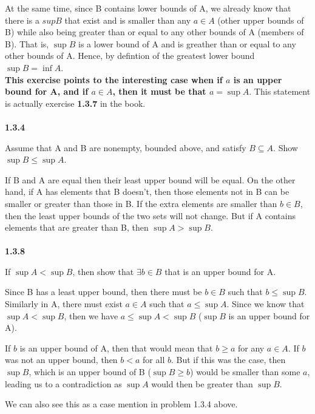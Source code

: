 At the same time, since B contains lower bounds of A, we already know that there is a $sup B$ that exist and is smaller
than any $a \in A$ (other upper bounds of B) while also being greater than or equal to any other bounds of A (members of B).
That is, $\sup B$ is a lower bound of A and is greather than or equal to any other bounds of A.
Hence, by defintion of the greatest lower bound $\sup B = \inf A$.
\\

\textbf{This exercise points to the interesting case when if $a$ is an upper bound for A,
and if $a \in A$, then it must be that $a = \sup A$}.
This statement is actually exercise \textbf{1.3.7} in the book.
\\~\\


\textbf{1.3.4}

Assume that A and B are nonempty, bounded above, and satisfy $B \subseteq A$. Show $\sup B \leq \sup A$.

If B and A are equal then their least upper bound will be equal.
On the other hand, if A has elements that B doesn't, then those elements not in B can be smaller or greater than those in B.
If the extra elements are smaller than $b \in B$, then the least upper bounds of the two sets will not change.
But if A contains elements that are greater than B, then $\sup A > \sup B$.
\\~\\


\textbf{1.3.8}

If $\sup A < \sup B$, then show that $\exists b \in B$ that is an upper bound for A.

Since B has a least upper bound, then there must be $b \in B$ such that $b \leq \sup B$.
Similarly in A, there must exist $a \in A$ such that $a \leq \sup A$.
Since we know that $\sup A < \sup B$, then we have $a \leq \sup A < \sup B$ ($\sup B$ is an upper bound for A).

If $b$ is an upper bound of A, then that would mean that $b \geq a$ for any $a \in A$.
If $b$ was not an upper bound, then $b < a$ for all $b$.
But if this was the case, then $\sup B$, which is an upper bound of B ($\sup B \geq b$) would be smaller than some
$a$, leading us to a contradiction as $\sup A$ would then be greater than $\sup B$.

We can also see this as a case mention in problem 1.3.4 above.
\\~\\



